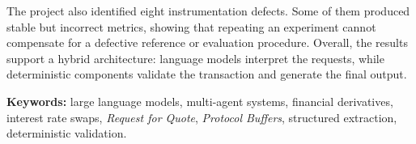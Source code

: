 The project also identified eight instrumentation defects. Some of them produced stable but incorrect metrics, showing that repeating an experiment cannot compensate for a defective reference or evaluation procedure. Overall, the results support a hybrid architecture: language models interpret the requests, while deterministic components validate the transaction and generate the final output.

\medskip

\noindent\textbf{Keywords:} large language models, multi-agent systems, financial derivatives, interest rate swaps, \textit{Request for Quote}, \textit{Protocol Buffers}, structured extraction, deterministic validation.
